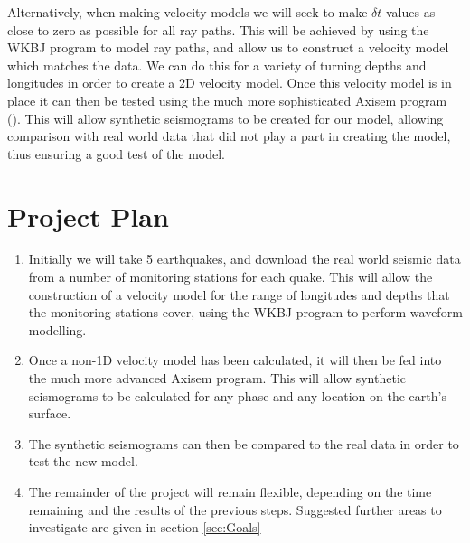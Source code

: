 \documentclass[11pt,a4paper]{article}
\begin{document}
Alternatively, when making velocity models we will seek to make $\delta t$ values as close to zero as possible for all ray paths. This will be achieved by using the WKBJ program to model ray paths, and allow us to construct a velocity model which matches the data. We can do this for a variety of turning depths and longitudes in order to create a 2D velocity model. Once this velocity model is in place it can then be tested using the much more sophisticated Axisem program (\cite{Nissen-Meyer2014}). This will allow synthetic seismograms to be created for our model, allowing comparison with real world data that did not play a part in creating the model, thus ensuring a good test of the model.



\section{Project Plan}

\begin{enumerate}
	\item Initially we will take 5 earthquakes, and download the real world seismic data from a number of monitoring stations for each quake. This will allow the construction of a velocity model for the range of longitudes and depths that the monitoring stations cover, using the WKBJ program to perform waveform modelling.
	\item Once a non-1D velocity model has been calculated, it will then be fed into the much more advanced Axisem program. This will allow synthetic seismograms to be calculated for any phase and any location on the earth's surface.
	\item The synthetic seismograms can then be compared to the real data in order to test the new model.
	\item The remainder of the project will remain flexible, depending on the time remaining and the results of the previous steps. Suggested further areas to investigate are given in section \ref{sec:Goals}
\end{enumerate}



\end{document}
